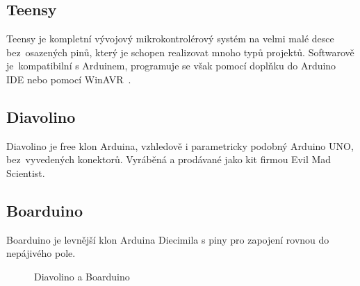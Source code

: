 	\subsection{Teensy}
	Teensy je kompletní vývojový mikrokontrolérový systém na velmi malé desce bez~osazených pinů, který je schopen realizovat mnoho typů projektů. Softwarově je~kompatibilní s Arduinem, programuje se však pomocí doplňku do Arduino IDE nebo pomocí WinAVR~\cite{ArduinoTeensy}.
	
	\subsection{Diavolino} 
	Diavolino je free klon Arduina, vzhledově i parametricky podobný Arduino UNO, bez~vyvedených konektorů. Vyráběná a prodávané jako kit firmou Evil Mad Scientist.
		
	\subsection{Boarduino} 
	Boarduino je levnější klon Arduina Diecimila s piny pro zapojení rovnou do nepájivého pole.

\begin{figure}[!ht]
    \centering
			\hspace*{5mm}
					\caption{Diavolino a Boarduino}
					\vspace{-30pt}	
	\end{figure}	


